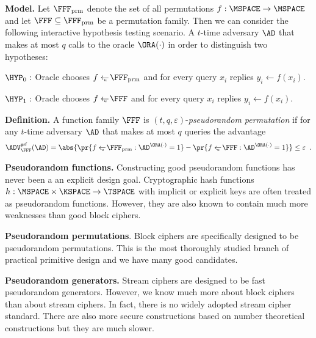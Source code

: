 \documentclass[landscape,footrule]{foils}
\begin{document}

\textbf{Model.}
Let $\FFFPERM$ denote the set of all permutations $f:\MSPACE\to\MSPACE$
and let $\FFF\subseteq \FFFPERM$ be a permutation family. Then we can
consider the following interactive hypothesis testing scenario. A
$t$-time adversary $\AD$ that makes at most $q$ calls to the oracle
$\ORA(\cdot)$ in order to distinguish two hypotheses:
\begin{triangles}
\item $\HYP_0:$ Oracle chooses $f\getsu\FFFPERM$ and for every query
  $x_i$ replies $y_i\gets f(x_i)$.
\item $\HYP_1:$ Oracle chooses $f\getsu \FFF$ and for every query
  $x_i$ replies $y_i\gets f(x_i)$.
\end{triangles}
\Bigskip

\textbf{Definition.}  A function family $\FFF$ is
$(t,q,\varepsilon)$-\emph{pseudorandom permutation} if for any $t$-time adversary
$\AD$ that makes at most $q$ queries the  advantage
\begin{align*}
  \advPRPXX{\FFF}{\AD}%
  =\abs{\pr{\smash{f\getsu\FFFPERM:\AD^{\ORA(\cdot)}=1}}-\pr{\smash{f\getsu\FFF:\AD^{\ORA(\cdot)}=1}}}
  \leq\varepsilon\enspace.
\end{align*}




\begin{triangles}
\item \textbf{Pseudorandom functions.}  Constructing good pseudorandom
  functions has never been a an explicit design goal.  Cryptographic
  hash functions \mbox{$h:\MSPACE\times\KSPACE\to\TSPACE$} with
  implicit or explicit keys are often treated as pseudorandom
  functions. However, they are also known to contain much more
  weaknesses than good block ciphers.\vspace*{1ex}

\item \textbf{Pseudorandom permutations}. Block ciphers are
  specifically designed to be pseudorandom permutations. This is the
  most thoroughly studied branch of practical primitive design and we
  have many good candidates.\vspace*{1ex}

\item \textbf{Pseudorandom generators.} Stream ciphers are designed to
  be fast pseudorandom generators. However, we know much more about
  block ciphers than about stream ciphers. In fact, there is no widely
  adopted stream cipher standard. There are also more secure
  constructions based on number theoretical constructions but they are
  much slower.
\end{triangles}
\end{document}

